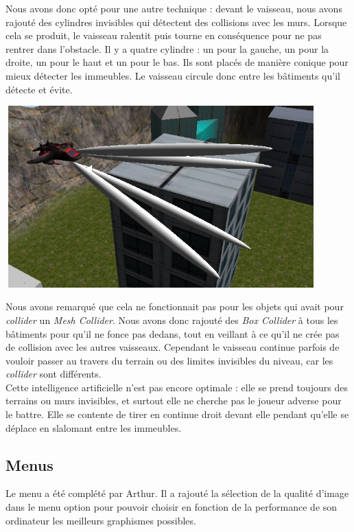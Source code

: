 \documentclass[10pt, titlepage]{report}
\begin{document}
Nous avons donc opté pour une autre technique : devant le vaisseau, nous avons rajouté des cylindres invisibles qui détectent des collisions avec les murs. Lorsque cela se produit, le vaisseau ralentit puis tourne en conséquence pour ne pas rentrer dans l'obstacle. Il y a quatre cylindre : un pour la gauche, un pour la droite, un pour le haut et un pour le bas. Ils sont placés de manière conique pour mieux détecter les immeubles. Le vaisseau circule donc entre les bâtiments qu'il détecte et évite.

\begin{center}
\includegraphics[height=7cm, width=12cm]{ia.jpg}
\end{center}

Nous avons remarqué que cela ne fonctionnait pas pour les objets qui avait pour \textit{collider} un\textit{ Mesh Collider}. Nous avons donc rajouté des \textit{Box Collider} à tous les bâtiments pour qu'il ne fonce pas dedans, tout en veillant à ce qu'il ne crée pas de collision avec les autres vaisseaux. Cependant le vaisseau continue parfois de vouloir passer au travers du terrain ou des limites invisibles du niveau, car les \textit{collider} sont différents.\\

Cette intelligence artificielle n'est pas encore optimale : elle se prend toujours des terrains ou murs invisibles, et surtout elle ne cherche pas le joueur adverse pour le battre. Elle se contente de tirer en continue droit devant elle pendant qu'elle se déplace en slalomant entre les immeubles.\\

\subsection{Menus}

Le menu a été complété par Arthur. Il a rajouté la sélection de la qualité d'image dans le menu option pour pouvoir choisir en fonction de la performance de son ordinateur les meilleurs graphismes possibles.\\
\end{document}
